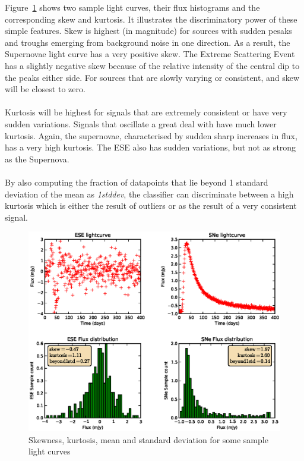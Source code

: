 \documentclass[10pt]{report}
\begin{document}
	Figure~\ref{fig:samplestats} shows two sample light curves, their flux histograms and the corresponding skew and kurtosis.  It illustrates the discriminatory power of these simple features.
	Skew is highest (in magnitude) for sources with sudden pesaks and troughs emerging from background noise in one direction. As a result, the Supernovae light curve has a very positive skew. The Extreme Scattering Event has a slightly negative skew because of the relative intensity of the central dip to the peaks either side. For sources that are slowly varying or consistent, and skew will be closest to zero. \\ \\
	Kurtosis will be highest for signals that are extremely consistent or have very sudden variations. Signals that oscillate a great deal with have much lower kurtosis. Again, the supernovae, characterised by sudden sharp increases in flux, has a very high kurtosis. The ESE also has sudden variations, but not as strong as the Supernova. \\ \\
	By also computing the fraction of datapoints that lie beyond 1 standard deviation of the mean as \emph{1stddev}, the classifier can discriminate between a high kurtosis which is either the result of outliers or as the result of a very consistent signal.
		
	\begin{figure}[ht!]
		\label{fig:samplestats}
		\centering
		\includegraphics[width=\textwidth]{figures/sample_hist.eps}
		\caption{Skewness, kurtosis, mean and standard deviation for some sample light curves}
	\end{figure}
	
\end{document}

